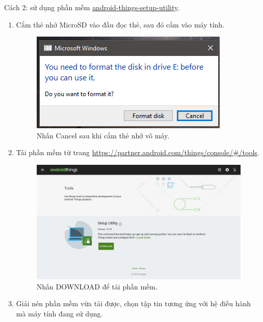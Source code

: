\newpage
\hspace*{0.25cm}Cách 2: sử dụng phần mềm \href{https://partner.android.com/things/console/#/tools}{android-things-setup-utility}.
\begin{enumerate}
\item Cắm thẻ nhớ MicroSD vào đầu đọc thẻ, sau đó cắm vào máy tính.
\begin{center}
\begin{figure}[htp]
\begin{center}
\includegraphics[scale=0.8]{image3/buoc2cach1s1.png}
\end{center}
\caption{Nhấn Cancel sau khi cắm thẻ nhớ vô máy.}
\label{refhinh1}
\end{figure}
\end{center}
\item Tải phần mềm từ trang \url{https://partner.android.com/things/console/#/tools}.
\begin{center}
\begin{figure}[htp]
\begin{center}
\includegraphics[scale=0.27]{image3/buoc2cach2s2.png}
\end{center}
\caption{Nhấn DOWNLOAD để tải phần mềm.}
\label{refhinh1}
\end{figure}
\end{center}
\newpage
\item Giải nén phần mềm vừa tải được, chọn tập tin tương ứng với hệ điều hành mà máy tính đang sử dụng.

\end{enumerate}
